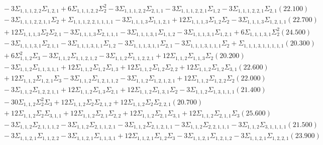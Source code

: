 \documentclass[12pt]{article}
\begin{document}
\begin{landscape}
\begin{align*}
		&\quad\quad -3\Sigma_{1,1,1,2,2}\Sigma_{1,2,1}+6\Sigma_{1,1,1,2,2}\Sigma_{2}^{2}-3\Sigma_{1,1,1,2,2}\Sigma_{2,1,1}-3\Sigma_{1,1,1,2,2,1}\Sigma_{1,2}-3\Sigma_{1,1,1,2,2,1}\Sigma_{2,1}(22.100) \\ 
		&\quad\quad -3\Sigma_{1,1,1,2,2,1,1}\Sigma_{2}+\Sigma_{1,1,1,2,2,1,1,1,1}-3\Sigma_{1,1,1,3}\Sigma_{1,1,2,1}+12\Sigma_{1,1,1,3}\Sigma_{1,2}\Sigma_{2}-3\Sigma_{1,1,1,3}\Sigma_{1,2,1,1}(22.700) \\ 
		&\quad\quad +12\Sigma_{1,1,1,3}\Sigma_{2}\Sigma_{2,1}-3\Sigma_{1,1,1,3}\Sigma_{2,1,1,1}-3\Sigma_{1,1,1,3,1}\Sigma_{1,1,2}-3\Sigma_{1,1,1,3,1}\Sigma_{1,2,1}+6\Sigma_{1,1,1,3,1}\Sigma_{2}^{2}(24.500) \\ 
		&\quad\quad -3\Sigma_{1,1,1,3,1}\Sigma_{2,1,1}-3\Sigma_{1,1,1,3,1,1}\Sigma_{1,2}-3\Sigma_{1,1,1,3,1,1}\Sigma_{2,1}-3\Sigma_{1,1,1,3,1,1,1}\Sigma_{2}+\Sigma_{1,1,1,3,1,1,1,1,1}(20.300) \\ 
		&\quad\quad +6\Sigma_{1,1,2}^{2}\Sigma_{3}-3\Sigma_{1,1,2}\Sigma_{1,1,2,1,2}-3\Sigma_{1,1,2}\Sigma_{1,1,2,2,1}+12\Sigma_{1,1,2}\Sigma_{1,1,3}\Sigma_{2}(20.200) \\ 
		&\quad\quad -3\Sigma_{1,1,2}\Sigma_{1,1,3,1,1}+12\Sigma_{1,1,2}\Sigma_{1,2}\Sigma_{1,3}+12\Sigma_{1,1,2}\Sigma_{1,2}\Sigma_{2,2}+12\Sigma_{1,1,2}\Sigma_{1,2}\Sigma_{3,1}(22.600) \\ 
		&\quad\quad +12\Sigma_{1,1,2}\Sigma_{1,2,1}\Sigma_{3}-3\Sigma_{1,1,2}\Sigma_{1,2,1,1,2}-3\Sigma_{1,1,2}\Sigma_{1,2,1,2,1}+12\Sigma_{1,1,2}\Sigma_{1,2,2}\Sigma_{2}(22.000) \\ 
		&\quad\quad -3\Sigma_{1,1,2}\Sigma_{1,2,2,1,1}+12\Sigma_{1,1,2}\Sigma_{1,3}\Sigma_{2,1}+12\Sigma_{1,1,2}\Sigma_{1,3,1}\Sigma_{2}-3\Sigma_{1,1,2}\Sigma_{1,3,1,1,1}(21.400) \\ 
		&\quad\quad -30\Sigma_{1,1,2}\Sigma_{2}^{2}\Sigma_{3}+12\Sigma_{1,1,2}\Sigma_{2}\Sigma_{2,1,2}+12\Sigma_{1,1,2}\Sigma_{2}\Sigma_{2,2,1}(20.700) \\ 
		&\quad\quad +12\Sigma_{1,1,2}\Sigma_{2}\Sigma_{3,1,1}+12\Sigma_{1,1,2}\Sigma_{2,1}\Sigma_{2,2}+12\Sigma_{1,1,2}\Sigma_{2,1}\Sigma_{3,1}+12\Sigma_{1,1,2}\Sigma_{2,1,1}\Sigma_{3}(25.600) \\ 
		&\quad\quad -3\Sigma_{1,1,2}\Sigma_{2,1,1,1,2}-3\Sigma_{1,1,2}\Sigma_{2,1,1,2,1}-3\Sigma_{1,1,2}\Sigma_{2,1,2,1,1}-3\Sigma_{1,1,2}\Sigma_{2,2,1,1,1}-3\Sigma_{1,1,2}\Sigma_{3,1,1,1,1}(21.500) \\ 
		&\quad\quad -3\Sigma_{1,1,2,1}\Sigma_{1,1,2,2}-3\Sigma_{1,1,2,1}\Sigma_{1,1,3,1}+12\Sigma_{1,1,2,1}\Sigma_{1,2}\Sigma_{3}-3\Sigma_{1,1,2,1}\Sigma_{1,2,1,2}-3\Sigma_{1,1,2,1}\Sigma_{1,2,2,1}(23.900) \\ 

\end{align*}
\end{landscape}
\end{document}
